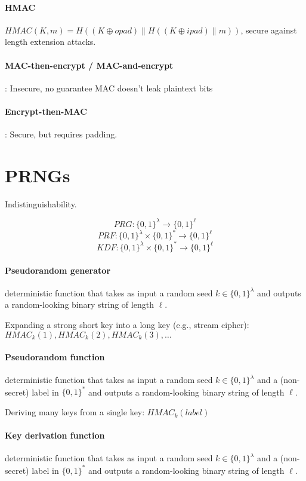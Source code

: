 \documentclass[11pt]{article}
\begin{document}
\paragraph{HMAC} $HMAC(K, m) = H((K \oplus opad) \parallel H((K \oplus ipad) \parallel m))$, secure against length extension attacks.

\paragraph{MAC-then-encrypt / MAC-and-encrypt}: Insecure, no guarantee MAC doesn't leak plaintext bits

\paragraph{Encrypt-then-MAC}: Secure, but requires padding.

\section{PRNGs} Indistinguishability.

$$PRG : \{0, 1\}^\lambda \to \{0, 1\}^\ell$$
$$PRF : \{0, 1\}^\lambda \times \{0, 1\}^* \to \{0, 1\}^\ell$$
$$KDF : \{0, 1\}^\lambda \times \{0, 1\}^* \to \{0, 1\}^\ell$$

\paragraph{Pseudorandom generator} deterministic function that takes as input a random seed $k \in \{0, 1\}^\lambda$ and outputs a random-looking binary string of length $\ell$.

Expanding a strong short key into a long key (e.g., stream cipher): $HMAC_k(1), HMAC_k(2), HMAC_k(3), \ldots$

\paragraph{Pseudorandom function} deterministic function that takes as input a random seed $k \in \{0, 1\}^\lambda$ and a (non-secret) label in $\{0, 1\}^*$ and outputs a random-looking binary string of length $\ell$.

Deriving many keys from a single key: $HMAC_k(label)$

\paragraph{Key derivation function} deterministic function that takes as input a random seed $k \in \{0, 1\}^\lambda$ and a (non-secret) label in $\{0, 1\}^*$ and outputs a random-looking binary string of length $\ell$.
\end{document}
